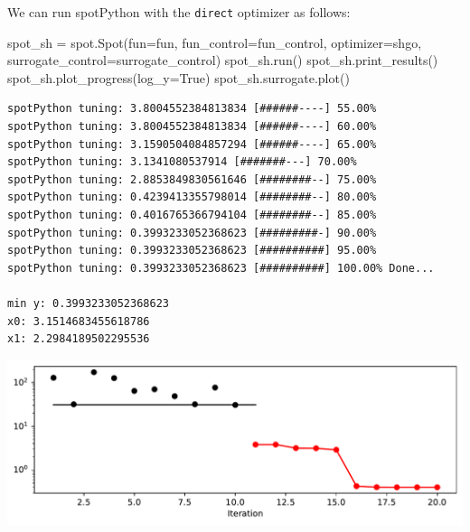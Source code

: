 \documentclass[
  letterpaper,
  DIV=11,
  numbers=noendperiod]{scrreprt}
\newenvironment{Shaded}{\begin{snugshade}}{\end{snugshade}}
\newcommand{\NormalTok}[1]{\textcolor[rgb]{0.00,0.23,0.31}{#1}}
\newcommand{\OperatorTok}[1]{\textcolor[rgb]{0.37,0.37,0.37}{#1}}
\newcommand{\VariableTok}[1]{\textcolor[rgb]{0.07,0.07,0.07}{#1}}
\begin{document}
\begin{tcolorbox}[enhanced jigsaw, rightrule=.15mm, coltitle=black, title=\textcolor{quarto-callout-tip-color}{\faLightbulb}\hspace{0.5em}{Tip: Selecting the Optimizer for the Surrogate}, opacitybacktitle=0.6, bottomrule=.15mm, opacityback=0, left=2mm, colback=white, leftrule=.75mm, colframe=quarto-callout-tip-color-frame, colbacktitle=quarto-callout-tip-color!10!white, toprule=.15mm, toptitle=1mm, bottomtitle=1mm, titlerule=0mm, breakable, arc=.35mm]

We can run spotPython with the \texttt{direct} optimizer as follows:

\begin{Shaded}
\begin{Highlighting}[]
\NormalTok{spot\_sh }\OperatorTok{=}\NormalTok{ spot.Spot(fun}\OperatorTok{=}\NormalTok{fun,}
\NormalTok{                    fun\_control}\OperatorTok{=}\NormalTok{fun\_control,}
\NormalTok{                    optimizer}\OperatorTok{=}\NormalTok{shgo,}
\NormalTok{                    surrogate\_control}\OperatorTok{=}\NormalTok{surrogate\_control)}
\NormalTok{spot\_sh.run()}
\NormalTok{spot\_sh.print\_results()}
\NormalTok{spot\_sh.plot\_progress(log\_y}\OperatorTok{=}\VariableTok{True}\NormalTok{)}
\NormalTok{spot\_sh.surrogate.plot()}
\end{Highlighting}
\end{Shaded}

\begin{verbatim}
spotPython tuning: 3.8004552384813834 [######----] 55.00% 
spotPython tuning: 3.8004552384813834 [######----] 60.00% 
spotPython tuning: 3.1590504084857294 [######----] 65.00% 
spotPython tuning: 3.1341080537914 [#######---] 70.00% 
spotPython tuning: 2.8853849830561646 [########--] 75.00% 
spotPython tuning: 0.4239413355798014 [########--] 80.00% 
spotPython tuning: 0.4016765366794104 [########--] 85.00% 
spotPython tuning: 0.3993233052368623 [#########-] 90.00% 
spotPython tuning: 0.3993233052368623 [##########] 95.00% 
spotPython tuning: 0.3993233052368623 [##########] 100.00% Done...

min y: 0.3993233052368623
x0: 3.1514683455618786
x1: 2.2984189502295536
\end{verbatim}

\includegraphics{004_spot_sklearn_optimization_files/figure-pdf/cell-11-output-2.pdf}


\end{tcolorbox}
\end{document}
